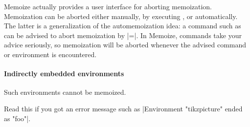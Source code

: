 \documentclass[a4paper,11pt]{article}
\begin{document}
Memoize actually provides a user interface for aborting memoization.
Memoization can be aborted either manually, by executing , or
automatically.  The latter is a generalization of the automemoization idea: a
command such as  can be advised to abort memoization by
|=|.  In Memoize,
commands take your advice seriously, so memoization will be aborted whenever
the advised command or environment is encountered.


\paragraph{Indirectly embedded environments} Such environments cannot be
memoized.

Read this if you got an error message such as |Environment "tikzpicture" ended
as "foo"|.
\end{document}
